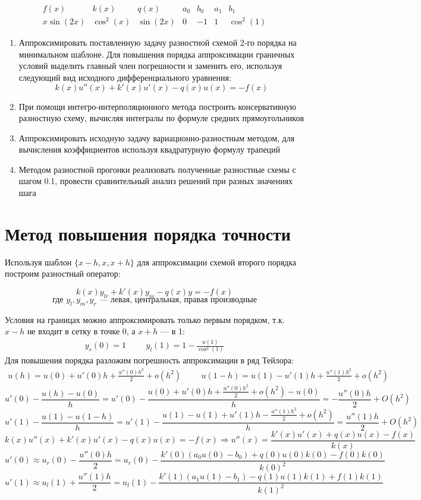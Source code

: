 \documentclass[a4paper]{article}
\begin{document}
	$$ 
	\begin{matrix}
		f(x) & k(x) & q(x) & a_0 & b_0 & a_1 & b_1  \\
		x \sin(2x) & \cos^2(x) & \sin(2x) & 0 & -1 & 1 & \cos^2(1)
	\end{matrix}
	$$
	
	\begin{enumerate}
		\item Аппроксимировать поставленную задачу разностной схемой 2-го порядка на минимальном шаблоне. Для повышения порядка аппроксимации граничных условий выделить главный член погрешности и заменить его, используя следующий вид исходного дифференциального уравнения: 
		$$k(x)u''(x) + k'(x)u'(x) - q(x)u(x) = -f(x)$$
		\item При помощи интегро-интерполяционного метода построить консервативную разностную схему, вычисляя интегралы по формуле средних прямоугольников
		\item Аппроксимировать исходную задачу вариационно-разностным методом, для вычисления коэффициентов используя квадратурную формулу трапеций
		\item Методом разностной прогонки реализовать полученные разностные схемы с шагом 0.1, провести сравнительный анализ решений при разных значениях шага
	\end{enumerate}
	
	\section{Метод повышения порядка точности}
	
	Используя шаблон $\{x - h, x, x + h\}$ для аппроксимации схемой второго порядка построим разностный оператор:
	\begin{large}
		$$ 	k(x) y_{lr} + k'(x) y_m - q(x) y = -f(x) $$
		$$ \text{где } y_l, y_m, y_r \text{ --- левая, центральная, правая производные}$$
	\end{large}
	Условия на границах можно аппроксимировать только первым порядком, т.к. $x - h$ не входит в сетку в точке 0, а $x + h$ --- в 1:
	$$ 
	\begin{matrix}
	y_r(0) = 1 &&& y_l(1) = 1 - \frac{u(1)}{\cos^2(1)}
	\end{matrix}
	$$
	Для повышения порядка разложим погрешность аппроксимации в ряд Тейлора:
	$$
	\begin{matrix}
	u(h) = u(0) + u'(0)h + \frac{u''(0)h^2}{2} + o(h^2) &&&
	u(1- h) = u(1) - u'(1)h + \frac{u''(1)h^2}{2} + o(h^2)
	\end{matrix}
	$$
	$$
		u'(0) - \frac{u(h) - u(0)}{h} 
		= u'(0) - \frac{u(0) + u'(0)h + \frac{u''(0)h^2}{2} + o(h^2) - u(0)}{h} 
		= -\frac{u''(0)h}{2} + O(h^2)
	$$
	$$  
		u'(1) - \frac{u(1) - u(1 - h)}{h} 
		= u'(1) - \frac{u(1) - u(1) + u'(1)h - \frac{u''(1)h^2}{2} + o(h^2)}{h} 
		= \frac{u''(1)h}{2} + O(h^2)
	$$
	$$ k(x) u''(x) + k'(x) u'(x) - q(x) u(x) = -f(x) \Rightarrow u''(x) = \frac{k'(x) u'(x) + q(x) u(x) - f(x)}{k(x)} $$
	$$ 
		u'(0) \approx u_r(0) - \frac{u''(0)h}{2} =
		u_r(0) - \frac{k'(0) (a_0 u(0) - b_0) + q(0) u(0) k(0) - f(0) k(0)}{k(0)^2}
	$$
	$$ 
		u'(1) \approx u_l(1) + \frac{u''(1)h}{2} =
		u_l(1) - \frac{k'(1) (a_1 u(1) - b_1) - q(1) u(1) k(1) + f(1) k(1)}{k(1)^2}
	$$
	
\end{document}
